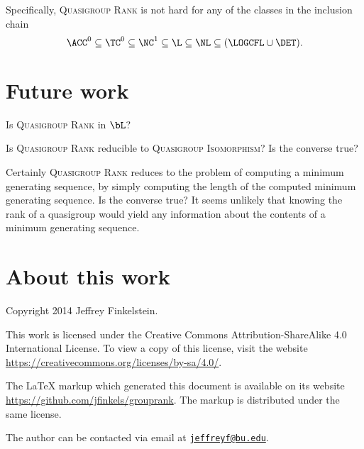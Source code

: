 \documentclass{article}
\newcommand{\email}[1]{\href{mailto:#1}{\nolinkurl{#1}}}
\begin{document}
Specifically, \textsc{Quasigroup Rank} is not hard for any of the classes in the inclusion chain
$$
\ACC^0 \subseteq \TC^0 \subseteq \NC^1 \subseteq \L \subseteq \NL \subseteq (\LOGCFL \cup \DET).
$$

\section{Future work}

Is \textsc{Quasigroup Rank} in $\bL$?

Is \textsc{Quasigroup Rank} reducible to \textsc{Quasigroup Isomorphism}?
Is the converse true?

Certainly \textsc{Quasigroup Rank} reduces to the problem of computing a minimum generating sequence, by simply computing the length of the computed minimum generating sequence.
Is the converse true?
It seems unlikely that knowing the rank of a quasigroup would yield any information about the contents of a minimum generating sequence.

\section{About this work}

Copyright 2014 Jef{}frey Finkelstein.

This work is licensed under the Creative Commons Attribution-ShareAlike 4.0 International License.
To view a copy of this license, visit the website \mbox{\url{https://creativecommons.org/licenses/by-sa/4.0/}}.

The \LaTeX{} markup which generated this document is available on its website \mbox{\url{https://github.com/jfinkels/grouprank}}.
The markup is distributed under the same license.

The author can be contacted via email at \email{jeffreyf@bu.edu}.

\printbibliography
\end{document}
